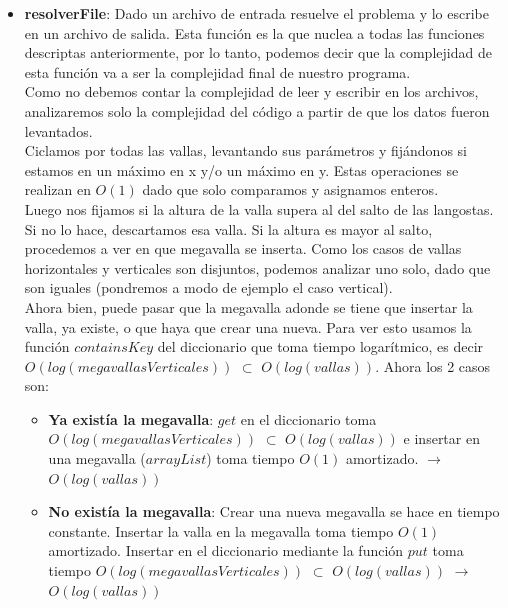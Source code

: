 \begin{itemize}
\begin{itemize}
\item \textbf{resolverFile}: Dado un archivo de entrada resuelve el problema y
lo escribe en un archivo de salida. Esta función es la que nuclea a todas las
funciones descriptas anteriormente, por lo tanto, podemos decir que la
complejidad de esta función va a ser la complejidad final de nuestro programa.\\
\indent Como no debemos contar la complejidad de leer y escribir en los
archivos, analizaremos solo la complejidad del código a partir de que los datos
fueron levantados.\\
\indent Ciclamos por todas las vallas, levantando sus parámetros y fijándonos si
estamos en un máximo en x y/o un máximo en y. Estas operaciones se realizan en
$O(1)$ dado que solo comparamos y asignamos enteros.\\
\indent Luego nos fijamos si la altura de la valla supera al del salto de las
langostas. Si no lo hace, descartamos esa valla. Si la altura es mayor al salto,
procedemos a ver en que megavalla se inserta. Como los casos de vallas
horizontales y verticales son disjuntos, podemos analizar uno solo, dado que son
iguales (pondremos a modo de ejemplo el caso vertical).\\
Ahora bien, puede pasar que la megavalla adonde se tiene que insertar la valla,
ya existe, o que haya que crear una nueva.  Para ver esto usamos la función
$containsKey$ del diccionario que toma tiempo logarítmico, es decir
$O(log(megavallasVerticales))$ $\subset$ $O(log(vallas))$. Ahora los 2 casos
son:
\begin{itemize}
 \item \textbf{Ya existía la megavalla}: $get$ en el diccionario toma
$O(log(megavallasVerticales))$ $\subset$ $O(log(vallas))$ e insertar en una
megavalla ($arrayList$) toma tiempo $O(1)$ amortizado. $\rightarrow$
$O(log(vallas))$
 \item \textbf{No existía la megavalla}: Crear una nueva megavalla se hace en
tiempo
constante. Insertar la valla en la megavalla toma tiempo $O(1)$ amortizado.
Insertar en el diccionario mediante la función $put$ toma tiempo
$O(log(megavallasVerticales))$ $\subset$ $O(log(vallas))$  $\rightarrow$
$O(log(vallas))$
\end{itemize}


\end{itemize}
\end{itemize}
